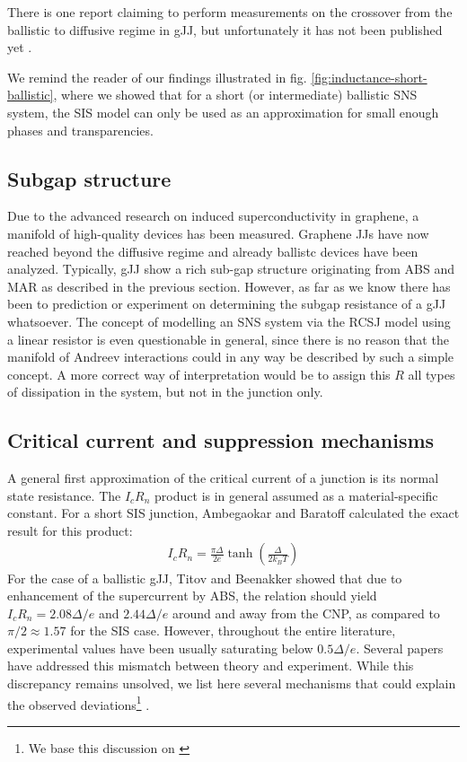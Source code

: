 There is one report claiming to perform measurements on the crossover from the ballistic to diffusive regime in gJJ, but unfortunately it has not been published yet \cite{kratzBallisticDiffusiveRegimes}.

We remind the reader of our findings illustrated in fig. \ref{fig:inductance-short-ballistic}, where we showed that for a short (or intermediate) ballistic SNS system, the SIS model can only be used as an approximation for small enough phases and transparencies.

\subsection{Subgap structure}
Due to the advanced research on induced superconductivity in graphene, a manifold of high-quality devices has been measured.
Graphene JJs have now reached beyond the diffusive regime and already ballistc devices have been analyzed.
Typically, gJJ show a rich sub-gap structure originating from ABS and MAR as described in the previous section.
However, as far as we know there has been to prediction or experiment on determining the subgap resistance of a gJJ whatsoever.
The concept of modelling an SNS system via the RCSJ model using a linear resistor is even questionable in general, since there is no reason that the manifold of Andreev interactions could in any way be described by such a simple concept.
A more correct way of interpretation would be to assign this $R$ all types of dissipation in the system, but not in the junction only.

\subsection{Critical current and suppression mechanisms}
A general first approximation of the critical current of a junction is its normal state resistance.
The $I_c R_n$ product is in general assumed as a material-specific constant\cite{tinkham_introduction_1996}.
For a short SIS junction, Ambegaokar and Baratoff calculated the exact result for this product:
\begin{eqnarray}
I_c R_n = \frac{\pi\Delta}{2e}\tanh\left(\frac{\Delta}{2k_BT}\right)
\end{eqnarray}
For the case of a ballistic gJJ, Titov and Beenakker\cite{titov_josephson_2006} showed that due to enhancement of the supercurrent by ABS, the relation should yield $I_cR_n=2.08\Delta/e$ and $2.44\Delta/e$ around and away from the CNP, as compared to $\pi/2\approx1.57$ for the SIS case.
However, throughout the entire literature, experimental values have been usually saturating below $0.5\Delta/e$.
Several papers have addressed this mismatch between theory and experiment.
While this discrepancy remains unsolved, we list here several mechanisms that could explain the observed deviations\footnote{We base this discussion on \cite{choiCompleteGateControl2013}} .

